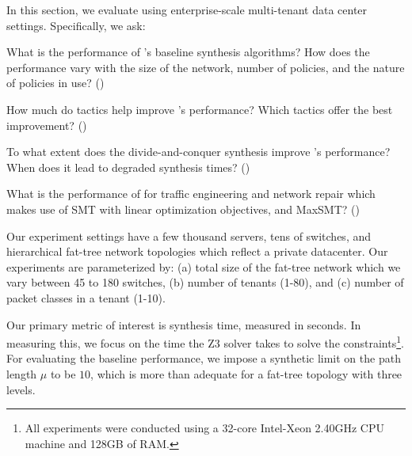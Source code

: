 In this section, we evaluate \Name using
enterprise-scale multi-tenant data
center settings. 
Specifically, we ask:
\begin{compactitemize}

\item What is the performance of \Name's baseline synthesis
  algorithms? How does the performance vary with the size of the
  network, number of policies, and the nature of policies in use? ()

\item How much do tactics help improve \Name's 
  performance? Which tactics offer the best improvement? ()

\item To what extent does the divide-and-conquer synthesis improve \Name's
  performance? When does it lead to degraded synthesis times? ()

\item What is the performance of \name for traffic engineering and network repair
which makes use of SMT with linear optimization objectives, and MaxSMT? ()

\end{compactitemize}
Our experiment settings have a few thousand servers, tens of switches,
and hierarchical fat-tree network topologies which reflect a private
datacenter. Our experiments are parameterized by: (a) total size of
the fat-tree network which we vary between 45 to 180 switches, (b) number of
tenants (1-80), and (c) number of packet classes in a tenant (1-10).

Our primary metric of interest is synthesis time, measured in
seconds. In measuring this, we focus on the time the Z3 solver takes
to solve the constraints\footnote{All experiments were conducted using a
	32-core Intel-Xeon 2.40GHz CPU machine and
	128GB of RAM.}. For evaluating the baseline performance, we impose a
synthetic limit on the path length $\mu$ to be $10$, which is more than adequate 
for a fat-tree topology with three levels. 

